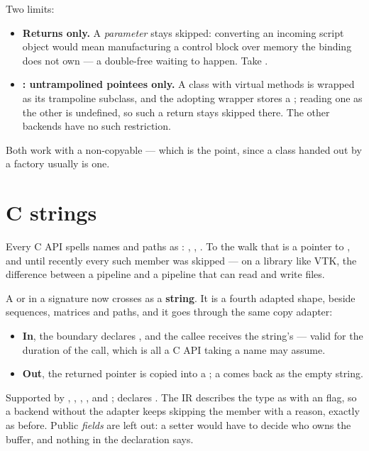 Two limits:

\begin{itemize}
  \item \textbf{Returns only.} A  \emph{parameter} stays
    skipped: converting an incoming script object would mean manufacturing a
    control block over memory the binding does not own --- a double-free waiting
    to happen. Take .
  \item \textbf{: untrampolined pointees only.} A class with virtual
    methods is wrapped as its trampoline subclass, and the adopting wrapper
    stores a ; reading one as the other is undefined, so such a return
    stays skipped there. The other backends have no such restriction.
\end{itemize}

Both work with a non-copyable  --- which is the point, since a class
handed out by a factory usually is one.

\section{C strings}
\label{sec:cstrings}

Every C API spells names and paths as :
, ,
. To the walk that is a pointer to ,
and until recently every such member was skipped --- on a library like VTK, the
difference between a pipeline and a pipeline that can read and write files.

A  or  in a signature now crosses as a
\textbf{string}. It is a fourth adapted shape, beside sequences, matrices and
paths, and it goes through the same copy adapter:

\begin{itemize}
  \item \textbf{In}, the boundary declares , and the callee
    receives the string's  --- valid for the duration of the call,
    which is all a C API taking a name may assume.
  \item \textbf{Out}, the returned pointer is copied into a ;
    a  comes back as the empty string.
\end{itemize}

Supported by , , , ,
 and ;  declares . The IR
describes the type as  with an  flag, so
a backend without the adapter keeps skipping the member with a reason, exactly
as before. Public  \emph{fields} are left out: a setter would have
to decide who owns the buffer, and nothing in the declaration says.

